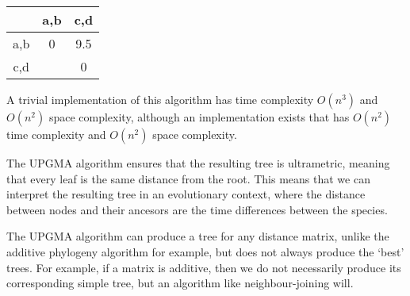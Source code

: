 \begin{tabular}{c|c|c}
  &a,b&c,d\\
  \hline
  a,b&0&9.5\\
  \hline
  c,d& &0\\
\end{tabular}

A trivial implementation of this algorithm has time complexity $O(n^3)$ and $O(n^2)$ space complexity, although an implementation exists that has $O(n^2)$ time complexity and $O(n^2)$ space complexity.

The UPGMA algorithm ensures that the resulting tree is ultrametric, meaning that every leaf is the same distance from the root. This means that we can interpret the resulting tree in an evolutionary context, where the distance between nodes and their ancesors are the time differences between the species.

The UPGMA algorithm can produce a tree for any distance matrix, unlike the additive phylogeny algorithm for example, but does not always produce the `best' trees. For example, if a matrix is additive, then we do not necessarily produce its corresponding simple tree, but an algorithm like neighbour-joining will.






